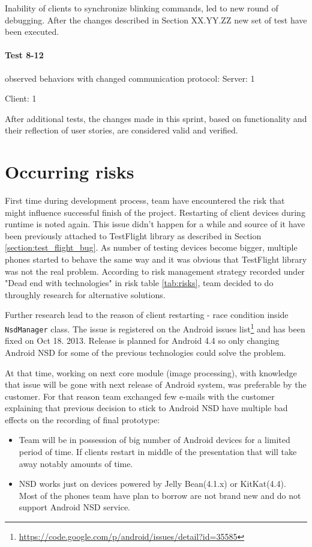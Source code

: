 Inability of clients to synchronize blinking commands, led to new round of debugging. After the changes described in Section XX.YY.ZZ new set of test have been executed. 

\paragraph{Test 8-12 } observed behaviors with changed communication protocol:
\newline \newline Server:
1    \tick

Client:
1     \tick

After additional tests, the changes made in this sprint, based on functionality and their reflection of user stories, are considered valid and verified. 

\section{Occurring risks}
\label{sec:sprint5_occuring_risks}
First time during development process, team have encountered the risk that might influence successful finish of the project. 
Restarting of client devices during runtime is noted again. This issue didn't happen for a while and source of it have been previously attached to TestFlight library as described in Section \ref{section:test_flight_bug}. As number of testing devices become bigger, multiple phones started to behave the same way and it was obvious that TestFlight library was not the real problem. According to risk management strategy recorded under "Dead end with technologies" in risk table \ref{tab:risks}, team decided to do throughly research for alternative solutions. 

Further research lead to the reason of client restarting - race condition inside \texttt{NsdManager} class. The issue is registered on the Android issues list\footnote{\url{https://code.google.com/p/android/issues/detail?id=35585}} and has been fixed on Oct 18. 2013. Release is planned for Android 4.4 so only changing Android NSD for some of the previous technologies could solve the problem. 

At that time, working on next core module (image processing), with knowledge that issue will be gone with next release of Android system, was preferable by the customer. For that reason team exchanged few e-mails with the customer explaining that previous decision to stick to Android NSD have multiple bad effects on the recording of final prototype:
\begin{itemize}
\item Team will be in possession of big number of Android devices for a limited period of time. If clients restart in middle of the presentation that will take away notably amounts of time.

\item NSD works just on devices powered by Jelly Bean(4.1.x) or KitKat(4.4). Most of the phones team have plan to borrow are not brand new and do not support Android NSD service.
\end{itemize}

